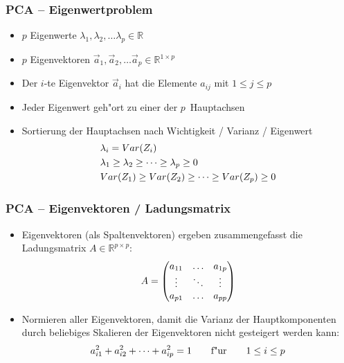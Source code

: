 \begin{frame}

\frametitle{PCA -- Eigenwertproblem}

\begin{itemize}
\setlength{\itemsep}{10pt}
\item $p$ Eigenwerte $\lambda_1, \lambda_2, \ldots \lambda_p \in \mathbb{R}$
\item $p$ Eigenvektoren $\vec{a}_1, \vec{a}_2, \ldots \vec{a}_p \in \mathbb{R}^{1\times p}$
\item Der $i$-te Eigenvektor $\vec{a}_i$ hat die Elemente $a_{ij}$ mit $1 \le j \le p$
\item Jeder Eigenwert geh"ort zu einer der $p$~Hauptachsen
\item Sortierung der Hauptachsen nach Wichtigkeit / Varianz / Eigenwert
\begin{align}
& \lambda_{i} = Var(Z_i) \notag \\
& \lambda_{1} \geq \lambda_{2} \geq \cdots \geq \lambda_{p} \geq 0 \notag \\
& Var(Z_{1}) \geq Var(Z_{2}) \geq \cdots \geq Var(Z_{p}) \geq 0 \notag
\end{align}
\end{itemize}
\end{frame}







\begin{frame}

\frametitle{PCA -- Eigenvektoren / Ladungsmatrix}

\begin{itemize}
\setlength{\itemsep}{20pt}
\item Eigenvektoren (als Spaltenvektoren) ergeben zusammengefasst die Ladungsmatrix $A \in \mathbb{R}^{p \times p}$:
\begin{equation}
A=\begin{pmatrix}
a_{11} & \hdots & a_{1p} \\
\vdots & \ddots & \vdots \\
a_{p1} & \hdots & a_{pp}
\end{pmatrix} \notag
\end{equation}
\item Normieren aller Eigenvektoren, damit die Varianz der Hauptkomponenten durch beliebiges Skalieren der Eigenvektoren nicht gesteigert werden kann:
\begin{equation}
a_{i1}^2 + a_{i2}^2 + \cdots + a_{ip}^2 = 1 \qquad \text{f"ur} \qquad 1 \le i \le p \notag
\end{equation}
\end{itemize}
\end{frame}










